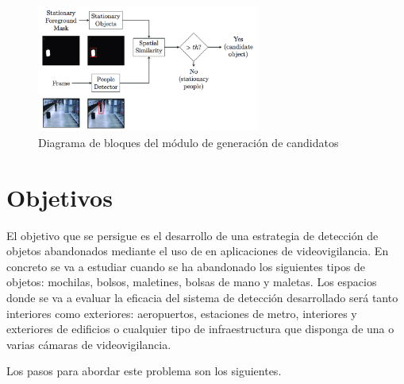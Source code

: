 \begin{figure}[ht]
\centering
\includegraphics[width=0.65\textwidth]{img/chapters/introduccion/Block-diagram-Stationary-detection.png}
\caption{\label{fig:diagram-stationary-detection}Diagrama de bloques del módulo de generación de candidatos \cite{luna2018}}
\end{figure}

\section{Objetivos}
\label{sec:objetivos}

El objetivo que se persigue es el desarrollo de una estrategia de detección de objetos abandonados mediante el uso de \cite{confusion-matrix} en aplicaciones de videovigilancia. En concreto se va a estudiar cuando se ha abandonado los siguientes tipos de objetos: mochilas, bolsos, maletines, bolsas de mano y maletas. Los espacios donde se va a evaluar la eficacia del sistema de detección desarrollado será tanto interiores como exteriores: aeropuertos, estaciones de metro, interiores y exteriores de edificios o cualquier tipo de infraestructura que disponga de una o varias cámaras de videovigilancia.

Los pasos para abordar este problema son los siguientes.

